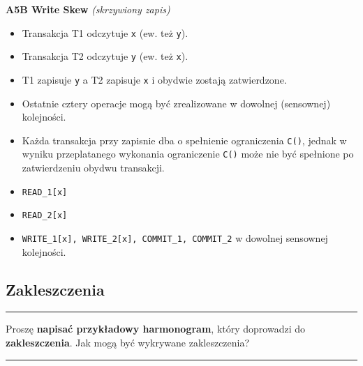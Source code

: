 \documentclass[a5paper,6pt]{article}
\newcommand{\horrule}[1]{\rule{\linewidth}{#1}}
\begin{document}
    \textbf{A5B Write Skew} \textit{(skrzywiony zapis)}
    \begin{itemize}
        \item Transakcja T1 odczytuje \texttt{x} (ew. też \texttt{y}).
        \item Transakcja T2 odczytuje \texttt{y} (ew. też \texttt{x}).
        \item T1 zapisuje \texttt{y} a T2 zapisuje \texttt{x} i obydwie
              zostają zatwierdzone.
        \item Ostatnie cztery operacje mogą być zrealizowane w dowolnej
              (sensownej) kolejności.
        \item Każda transakcja przy zapisnie dba o spełnienie ograniczenia
              \texttt{C()}, jednak w wyniku przeplatanego wykonania ograniczenie
              \texttt{C()} może nie być spełnione po zatwierdzeniu obydwu
              transakcji.
        \item \texttt{READ\_1[x]}
        \item \texttt{READ\_2[x]}
        \item \texttt{WRITE\_1[x], WRITE\_2[x], COMMIT\_1, COMMIT\_2}
              w dowolnej sensownej kolejności.
    \end{itemize}


\pagebreak

    \subsection{Zakleszczenia} %
    \label{sub:zakleszczenia}

    \horrule{0.5pt}
    Proszę \textbf{napisać przykładowy harmonogram}, który doprowadzi do
    \textbf{zakleszczenia}.
    Jak mogą być wykrywane zakleszczenia?\\
    \horrule{0.5pt}
\end{document}
